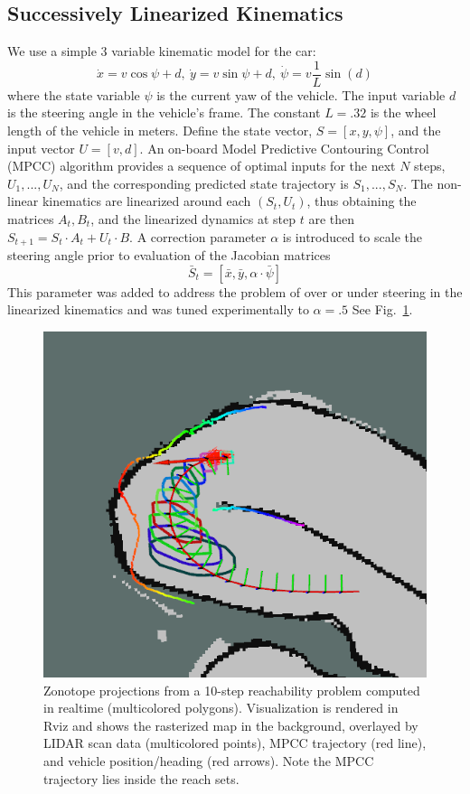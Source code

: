 \documentclass[runningheads]{llncs}
\begin{document}
\subsection{Successively Linearized Kinematics}

We use a simple 3 variable kinematic model for the car:
\begin{equation}
\dot{x} = v \cos{\psi + d},~\dot{y} = v \sin{\psi + d},~\dot{\psi} = v \frac{1}{L} \sin(d)
\end{equation}
where the state variable $\psi$ is the current yaw of the vehicle. The input variable $d$ is the steering angle in the vehicle's frame. The constant $L=.32$ is the wheel length of the vehicle in meters. 
Define the state vector, $S= [x, y, \psi]$, and the input vector  $U = [v, d]$.
An on-board Model Predictive Contouring Control  (MPCC) algorithm provides a sequence of optimal inputs for the next $N$ steps, $U_1,...,U_N$, and the corresponding predicted state trajectory is $S_1,...,S_N$. 
The non-linear kinematics are linearized around each $(S_t,U_t)$, thus obtaining the matrices $A_t,B_t$, and the linearized dynamics at step $t$ are then $S_{t+1} = S_t \cdot A_t + U_t \cdot B$.
A correction parameter $\alpha$ is introduced to scale the steering angle prior to evaluation of the Jacobian matrices 
$$\bar{S}_t = [\bar{x}, \bar{y}, \alpha\cdot\bar{\psi}]$$
This parameter was added to address the problem of over or under steering in the linearized kinematics and was tuned experimentally to $\alpha=.5$ 
See Fig.~\ref{fig:correctness}.


\begin{figure}
    \centering
    \includegraphics[width=.48\textwidth]{screenshots/FinalTopCorner.png}
    \caption{Zonotope projections from a 10-step reachability problem computed in realtime (multicolored polygons). Visualization is rendered in Rviz and shows the rasterized map in the background, overlayed by LIDAR scan data (multicolored points), MPCC trajectory (red line), and vehicle position/heading (red arrows). Note the MPCC trajectory lies inside the reach sets.}
    \label{fig:correctness}
\end{figure}
\end{document}
